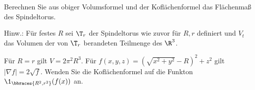 
\begin{exercise}

Berechnen Sie aus obiger Volumsformel und der Koflächenformel das Flächenmaß des Spindeltorus.

Hinw.:
Für festes $R$ sei $\T_r$ der Spindeltorus wie zuvor für $R, r$ definiert und $V_t$ das Volumen der von $\T_r$ berandeten Teilmenge des $\R^3$.

Für $R = r$ gilt $V = 2 \pi^2 R^3$.
Für $f(x, y, z) = (\sqrt{x^2 + y^2} - R)^2 + z^2$ gilt $|\nabla f| = 2 \sqrt f$.
Wenden Sie die Koflächenformel auf die Funkton $\1_\bbraces{R^2, r^2}(f(x))$ an.

\end{exercise}


